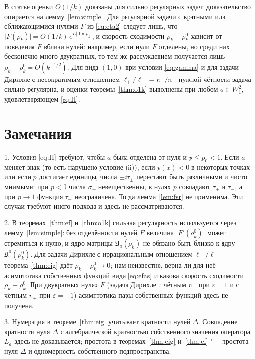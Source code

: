 \documentclass[12pt,a4paper]{article}
\numberwithin{equation}{section}
\theoremstyle{definition}
\newcommand{\abs}[1]{\lvert#1\rvert}
\newcommand{\Imm}{\operatorname{Im}}
\newcommand{\Uf}{\mathfrak U}
\begin{document}
В статье оценки $O(1/k)$ доказаны для сильно регулярных задач: доказательство опирается на
лемму~\ref{lem:simple}. Для регулярной задачи с кратными или сближающимися нулями $F$ из
\eqref{eq:eta2} следует лишь, что $\abs{F(\rho_k)}=O(1/k)\,e^{L\abs{\Imm\rho_k}}$, и скорость
сходимости $\rho_k-\rho_k^0$ зависит от поведения $F$ вблизи нулей: например, если нули $F$
отделены, но среди них бесконечно много двукратных, то тем же рассуждением получается лишь
$\rho_k-\rho_k^0=O(k^{-1/2})$. Для вида $(1,0)$ при условии \eqref{eq:gamma} и для
задачи Дирихле с несократимым отношением $\ell_+/\ell_-=n_+/n_-$ нужной чётности задача сильно
регулярна, и оценки теоремы~\ref{thm:o1k} выполнены при любом $a\in W^2_1$, удовлетворяющем
\eqref{eq:H}.

\section{Замечания}

1. Условия \eqref{eq:H} требуют, чтобы $a$ была отделена от нуля и $p\le p_0<1$. Если $a$ меняет
знак (то есть нарушено условие (ii)), если $p(x)<0$ в некоторых точках или если $p$ достигает
единицы, числа $\pm i\tau_\pm$ перестают быть различными и чисто мнимыми: при $p<0$
числа $\sigma_\pm$ невещественны, в нулях $p$ совпадают $\tau_+$ и $\tau_-$, а при $p\to1$ функция
$\tau_-$ неограничена. Тогда лемма~\ref{lem:fsr} не применима. Эти случаи требуют иного подхода и
здесь не рассматриваются.

2. В теоремах~\ref{thm:ef} и~\ref{thm:o1k} сильная регулярность используется через
лемму~\ref{lem:simple}: без отделённости нулей $F$ величина $\abs{F'(\rho_k^0)}$ может стремиться к
нулю, и ядро матрицы $\Uf_a(\rho_k)$ не обязано быть близко к ядру $\Uf^0(\rho_k^0)$. Для задачи
Дирихле с иррациональным отношением $\ell_+/\ell_-$ теорема~\ref{thm:eig} даёт
$\rho_k-\rho_k^0\to0$; нам неизвестно, верна ли для неё асимптотика собственных функций вида
\eqref{eq:efas} и какова скорость сходимости $\rho_k-\rho_k^0$. При двукратных нулях $F$ (задача
Дирихле с чётным $n_-$ при $\varepsilon=1$ и с чётным $n_+$ при $\varepsilon=-1$) асимптотика пары
собственных функций здесь не получена.

3. Нумерация в теореме~\ref{thm:eig} учитывает кратности нулей $\Delta$. Совпадение кратности
нуля $\Delta$ с алгебраической кратностью собственного значения оператора $L_a$ здесь не
доказывается; простота в теоремах~\ref{thm:eig}
и~\ref{thm:ef} "--- простота нуля $\Delta$ и одномерность собственного подпространства.
\end{document}
